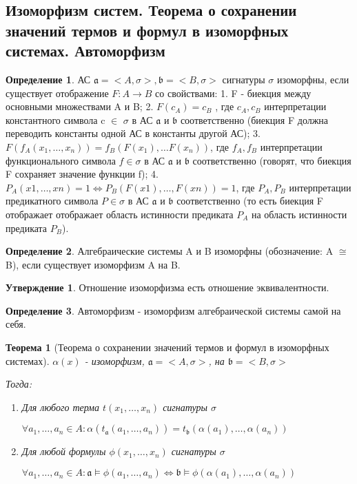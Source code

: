 \documentclass[a4paper]{article}
\newtheorem{theorem}{Теорема}[section]
\theoremstyle{definition}
\newtheorem*{definition}{Определение}
\newtheorem*{statement}{Утверждение}
\theoremstyle{remark}
\begin{document}
    \subsection{Изоморфизм систем. Теорема о сохранении значений термов и формул в изоморфных системах. Автоморфизм}
    \begin{definition}
        АС $\mathfrak{a} = <A, \sigma>, \mathfrak{b} = <B, \sigma>$ сигнатуры $\sigma$ изоморфны, если существует отображение
        $F : A \to B$ со свойствами:
        1. F - биекция между основными множествами A и B;
        2. $F(c_A) = c_B$ , где $c_A, c_B$ интерпретации константного символа c $\in$ $\sigma$ в АС
        $\mathfrak{a}$ и $\mathfrak{b}$ соответственно (биекция F должна переводить константы одной АС в
        константы другой АС);
        3. $F(f_A(x_1, \dots , x_n)) = f_B(F(x_1), \dots F(x_n))$, где $f_A, f_B$ интерпретации функционального символа 
        $f \in \sigma$ в АС $\mathfrak{a}$ и $\mathfrak{b}$ соответственно (говорят, что биекция
        F сохраняет значение функции f);
        4. $P_A(x1, \dots , xn) = 1 \Leftrightarrow P_B(F(x1), \dots , F(xn)) = 1$, где $P_A, P_B$ интерпретации предикатного 
        символа $P \in \sigma$ в АС $\mathfrak{a}$ и $\mathfrak{b}$ соответственно (то есть биекция F отображает отображает область 
        истинности предиката $P_A$ на область истинности предиката $P_B$).
    \end{definition}
    \begin{definition}
        Алгебраические системы A и B изоморфны (обозначение: A $\cong$ B), если существует 
        изоморфизм A на B.
    \end{definition}
    \begin{statement}
        Отношение изоморфизма есть отношение эквивалентности.
    \end{statement}
    \begin{definition}
        Автоморфизм - изоморфизм алгебраической системы самой на себя.
    \end{definition}
    \begin{theorem}[Теорема о сохранении значений термов и формул в изоморфных системах]
        $\alpha(x)$ - изоморфизм, $\mathfrak{a} = <A, \sigma>$, на $\mathfrak{b} = <B, \sigma>$

        Тогда:
        \begin{enumerate}
            \item Для любого терма $t(x_1, \dots, x_n)$ сигнатуры $\sigma$
            
            $\forall a_1, \dots, a_n \in A: \alpha (t_\mathfrak{a}(a_1, \dots, a_n))= t_\mathfrak{b}(\alpha(a_1), \dots, \alpha(a_n))$

            \item Для любой формулы $\phi(x_1, \dots, x_n)$ сигнатуры $\sigma$
            
            $\forall a_1, \dots, a_n \in A: \mathfrak{a}\models \phi(a_1, \dots, a_n)\Leftrightarrow \mathfrak{b} \models \phi(\alpha(a_1), \dots, \alpha(a_n))$
        \end{enumerate}
    \end{theorem}
\end{document}
